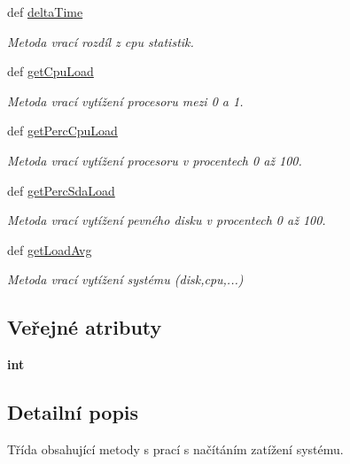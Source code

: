 \begin{DoxyCompactItemize}
def \hyperlink{classSysLoad_1_1SysLoad_abaf98f579871142a2bca31ee312b55b5}{delta\-Time}
\begin{DoxyCompactList}\small\item\em Metoda vrací rozdíl z cpu statistik. \end{DoxyCompactList}\item 
def \hyperlink{classSysLoad_1_1SysLoad_a0e61f72ce5be5549a61836ae78352462}{get\-Cpu\-Load}
\begin{DoxyCompactList}\small\item\em Metoda vrací vytížení procesoru mezi 0 a 1. \end{DoxyCompactList}\item 
def \hyperlink{classSysLoad_1_1SysLoad_a850f2f2f4bff009a9fe24faffbebe3ca}{get\-Perc\-Cpu\-Load}
\begin{DoxyCompactList}\small\item\em Metoda vrací vytížení procesoru v procentech 0 až 100. \end{DoxyCompactList}\item 
def \hyperlink{classSysLoad_1_1SysLoad_a9464f6f2f01a89169aa36d818f1af51c}{get\-Perc\-Sda\-Load}
\begin{DoxyCompactList}\small\item\em Metoda vrací vytížení pevného disku v procentech 0 až 100. \end{DoxyCompactList}\item 
def \hyperlink{classSysLoad_1_1SysLoad_ab21272b6a351f0a904b2cd39ac3df38a}{get\-Load\-Avg}
\begin{DoxyCompactList}\small\item\em Metoda vrací vytížení systému (disk,cpu,...) \end{DoxyCompactList}\end{DoxyCompactItemize}
\subsection*{Veřejné atributy}
\begin{DoxyCompactItemize}
\item 
\hypertarget{classSysLoad_1_1SysLoad_ac2f7c48ad5c162afa0efeca1024566f1}{{\bfseries int}}\label{d0/d3a/classSysLoad_1_1SysLoad_ac2f7c48ad5c162afa0efeca1024566f1}

\end{DoxyCompactItemize}


\subsection{Detailní popis}
Třída obsahující metody s prací s načítáním zatížení systému. 

